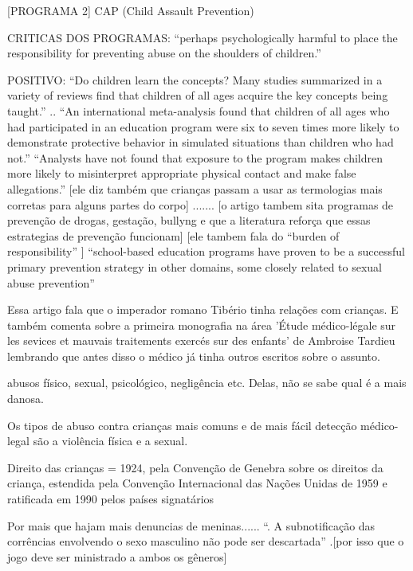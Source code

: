 [PROGRAMA 2] CAP (Child Assault Prevention) \cite{finkelhor2009prevention}

CRITICAS DOS PROGRAMAS: ``perhaps psychologically harmful to place the responsibility for preventing abuse on the shoulders of children.''\cite{finkelhor2009prevention}

POSITIVO: ``Do children learn the concepts? Many studies summarized in a variety of reviews find that children of all ages acquire the key concepts being taught.''\cite{finkelhor2009prevention} .. ``An international meta-analysis found that children of all ages who had participated in an education program were six to seven times more likely to demonstrate protective behavior in simulated situations than children who had not.'' ``Analysts have not found that exposure to the program makes children more likely to misinterpret appropriate physical contact and make false allegations.'' [ele diz também que crianças passam a usar as termologias mais corretas para alguns partes do corpo]   ....... [o artigo tambem sita programas de prevenção de drogas, gestação, bullyng e que a literatura reforça que essas estrategias de prevenção funcionam] [ele tambem fala do “burden of responsibility” ] ``school-based education programs have proven to be a successful primary prevention strategy in other domains, some closely related to sexual abuse prevention'' \cite{finkelhor2009prevention}
 
Essa artigo fala que o imperador romano Tibério tinha relações com crianças. E também comenta sobre a primeira monografia na área 'Étude médico-légale sur les sevices et mauvais traitements exercés sur des enfants' de Ambroise Tardieu lembrando que antes disso o médico já tinha outros escritos sobre o assunto. \cite{aded2006abuso}

abusos físico, sexual, psicológico, negligência etc. Delas, não se sabe qual é a mais danosa. \cite{aded2006abuso} 

Os tipos de abuso contra crianças mais comuns e de mais fácil detecção médico-legal são a violência física e a sexual. \cite{aded2006abuso} 

Direito das crianças = 1924, pela Convenção de Genebra sobre os direitos da criança, estendida pela Convenção Internacional das Nações Unidas de 1959 e ratificada em 1990 pelos países signatários \cite{aded2006abuso} 

Por mais que hajam mais denuncias de meninas...... ``. A subnotificação das corrências envolvendo o sexo masculino não pode ser descartada'' \cite{aded2006abuso}.[por isso que o jogo deve ser ministrado a ambos os gêneros]

